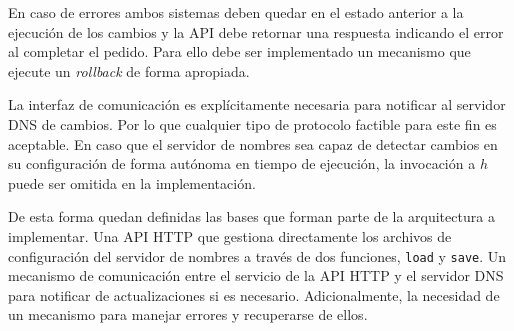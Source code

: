 En caso de errores ambos sistemas deben quedar en el estado anterior a la ejecución de los cambios y la API debe retornar una respuesta indicando el error al completar el pedido. Para ello debe ser implementado un mecanismo que ejecute un \textit{rollback} de forma apropiada.

La interfaz de comunicación es explícitamente necesaria para notificar al servidor DNS de cambios. Por lo que cualquier tipo de protocolo factible para este fin es aceptable. En caso que el servidor de nombres sea capaz de detectar cambios en su configuración de forma autónoma en tiempo de ejecución, la invocación a $h$ puede ser omitida en la implementación.

De esta forma quedan definidas las bases que forman parte de la arquitectura a implementar. Una API HTTP que gestiona directamente los archivos de configuración del servidor de nombres a través de dos funciones, \verb|load| y \verb|save|. Un mecanismo de comunicación entre el servicio de la API HTTP y el servidor DNS para notificar de actualizaciones si es necesario. Adicionalmente, la necesidad de un mecanismo para manejar errores y recuperarse de ellos.
